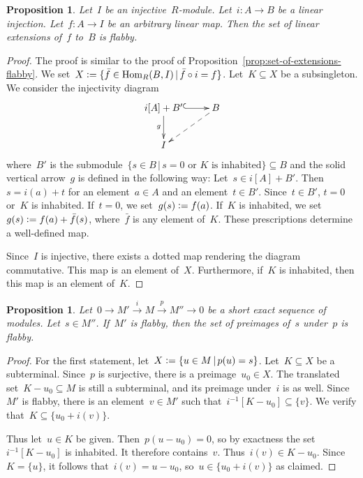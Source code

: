 \documentclass[oneside]{amsart}
\theoremstyle{definition}
\theoremstyle{plain}
\newtheorem{prop}[defn]{Proposition}
\theoremstyle{remark}
\newcommand{\xra}[1]{\xrightarrow{#1}}
\newcommand{\defeq}{\vcentcolon=}
\DeclareMathOperator{\Hom}{Hom}
\renewcommand{\_}{\mathpunct{.}\,}
\begin{document}
\begin{prop}\label{prop:set-of-linear-extensions-flabby}
Let~$I$ be an injective~$R$-module. Let~$i : A \to B$ be a linear injection.
Let~$f : A \to I$ be an arbitrary linear map. Then the set of linear extensions of~$f$ to~$B$
is flabby.\end{prop}

\begin{proof}The proof is similar to the proof of
Proposition~\ref{prop:set-of-extensions-flabby}. We
set~$X \defeq \{ \bar{f} \in \Hom_R(B,I) \,|\, \bar{f} \circ i =
f \}$. Let~$K \subseteq X$ be a subsingleton. We consider the injectivity diagram
\[ \xymatrix{
  i[A] + B' \ar@{^{(}->}[r]\ar[d]_g & B \ar@{-->}[ld] \\
  I
} \]
where~$B'$ is the submodule~$\{ s \in B \,|\, \text{$s = 0$ or $K$ is
inhabited} \} \subseteq B$ and the solid vertical arrow~$g$ is defined in the following
way: Let~$s \in i[A] + B'$. Then~$s = i(a) + t$ for an element~$a \in A$ and an
element~$t \in B'$. Since~$t \in B'$, $t = 0$ or~$K$ is inhabited. If~$t = 0$,
we set~$g(s) \defeq f(a)$. If~$K$ is inhabited, we set~$g(s) \defeq f(a) +
\bar{f}(s)$, where~$\bar{f}$ is any element of~$K$. These prescriptions
determine a well-defined map.

Since~$I$ is injective, there exists a dotted map rendering the diagram
commutative. This map is an element of~$X$. Furthermore, if~$K$ is inhabited,
then this map is an element of~$K$.
\end{proof}

\begin{prop}Let~$0 \to M' \xra{i} M \xra{p} M'' \to 0$ be a short exact
sequence of modules. Let~$s \in M''$. If~$M'$ is flabby, then the set of
preimages of~$s$ under~$p$ is flabby.
\end{prop}

\begin{proof}For the first statement, let~$X \defeq \{ u \in M \,|\, p(u) = s
\}$. Let~$K \subseteq X$ be a subterminal. Since~$p$ is surjective, there is a
preimage~$u_0 \in X$. The translated set~$K - u_0 \subseteq M$ is still a
subterminal, and its preimage under~$i$ is as well. Since~$M'$ is flabby, there
is an element~$v \in M'$ such that~$i^{-1}[K - u_0] \subseteq \{v\}$. We verify
that~$K \subseteq \{u_0 + i(v)\}$.

Thus let~$u \in K$ be given. Then~$p(u - u_0) = 0$, so by exactness the
set~$i^{-1}[K - u_0]$ is inhabited. It therefore contains~$v$. Thus~$i(v) \in K
- u_0$. Since~$K = \{u\}$, it follows that~$i(v) = u - u_0$, so~$u \in \{u_0 +
i(v)\}$ as claimed.
\end{proof}
\end{document}
